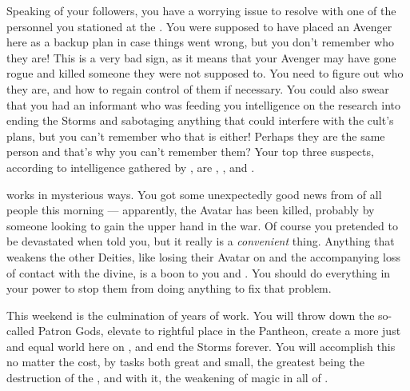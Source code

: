 \documentclass[char]{GL2020}
\begin{document}
Speaking of your followers, you have a worrying issue to resolve with one of the personnel you stationed at the \pSc{}. You were supposed to have placed an Avenger here as a backup plan in case things went wrong, but you don't remember who they are! This is a very bad sign, as it means that your Avenger may have gone rogue and killed someone they were not supposed to. You need to figure out who they are, and how to regain control of them if necessary. You could also swear that you had an informant who was feeding you intelligence on the \pTech{} research into ending the Storms and sabotaging anything that could interfere with the cult's plans, but you can't remember who that is either! Perhaps they are the same person and that's why you can't remember them? Your top three suspects, according to intelligence gathered by \cChupSecond{}, are \cInterpol{\full}, \cChupAvenger{\full}, and \cWildCard{\full}.

\cGenesis{} works in mysterious ways. You got some unexpectedly good news from \cEbbPriest{} of all people this morning — apparently, the \cEbb{} Avatar has been killed, probably by someone looking to gain the upper hand in the war. Of course you pretended to be devastated when \cEbbPriest{\they} told you, but it really is a \emph{convenient} thing. Anything that weakens the other Deities, like losing their Avatar on \pEarth{} and the accompanying loss of contact with the divine, is a boon to you and \cGenesis{}. You should do everything in your power to stop them from doing anything to fix that problem.

This weekend is the culmination of years of work. You will throw down the so-called Patron Gods, elevate \cGenesis{} to \cGenesis{\their} rightful place in the Pantheon, create a more just and equal world here on \pEarth{}, and end the Storms forever. You will accomplish this no matter the cost, by tasks both great and small, the greatest being the destruction of the \pSchool{}, and with it, the weakening of magic in all of \pEarth{}.
\end{document}
